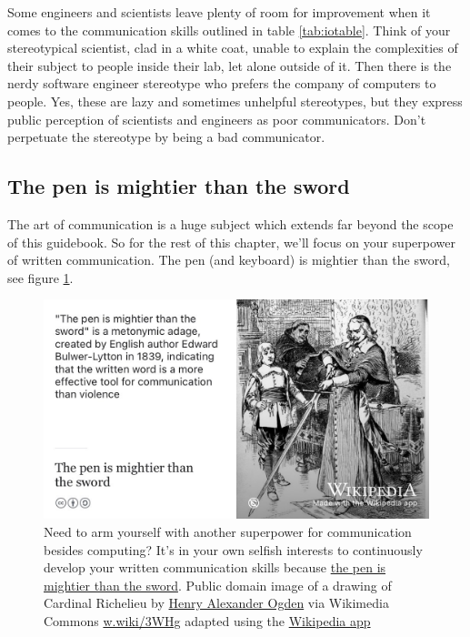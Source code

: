 \documentclass[
]{book}
\begin{document}
Some engineers and scientists leave plenty of room for improvement when it comes to the communication skills outlined in table \ref{tab:iotable}. Think of your stereotypical scientist, clad in a white coat, unable to explain the complexities of their subject to people inside their lab, let alone outside of it. Then there is the nerdy software engineer stereotype who prefers the company of computers to people. Yes, these are lazy and sometimes unhelpful stereotypes, but they express public perception of scientists and engineers as poor communicators. Don't perpetuate the stereotype by being a bad communicator.

\hypertarget{mightier}{%
\subsection{The pen is mightier than the sword}\label{mightier}}

The art of communication is a huge subject which extends far beyond the scope of this guidebook. So for the rest of this chapter, we'll focus on your superpower of written communication. The pen (and keyboard) is mightier than the sword, see figure \ref{fig:mighty-pen-fig}.

\begin{figure}

{\centering \includegraphics[width=1\linewidth]{images/the-pen-is-mightier-than-the-sword} 

}

\caption{Need to arm yourself with another superpower for communication besides computing? It's in your own selfish interests to continuously develop your written communication skills because \href{https://en.wikipedia.org/wiki/The_pen_is_mightier_than_the_sword}{the pen is mightier than the sword}. Public domain image of a drawing of Cardinal Richelieu by \href{https://en.wikipedia.org/wiki/Henry_Alexander_Ogden}{Henry Alexander Ogden} via Wikimedia Commons \href{https://w.wiki/3WHg}{w.wiki/3WHg} adapted using the \href{https://apps.apple.com/us/app/wikipedia/id324715238}{Wikipedia app}}\label{fig:mighty-pen-fig}
\end{figure}
\end{document}
